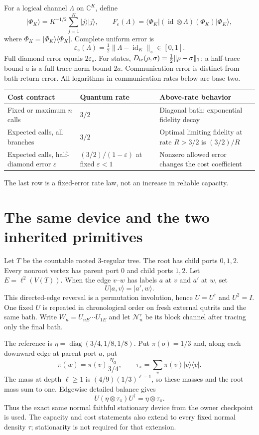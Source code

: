 \documentclass[11pt]{article}
\newcommand{\id}{\operatorname{id}}
\newcommand{\ket}[1]{\lvert #1\rangle}
\newcommand{\bra}[1]{\langle #1\rvert}
\newcommand{\norm}[1]{\lVert #1\rVert}
\newcommand{\cN}{\mathcal N}
\newcommand{\D}{D_{\rm tr}}
\newcommand{\Ph}{\Phi_K}
\begin{document}
For a logical channel $\Lambda$ on $\mathbb C^K$, define
\[
 \ket{\Phi_K}=K^{-1/2}\sum_{j=1}^K\ket{j}\ket{j},\qquad
 F_e(\Lambda)=\bra{\Phi_K}(\id\otimes\Lambda)(\Ph)\ket{\Phi_K},
\]
where $\Ph=\ket{\Phi_K}\bra{\Phi_K}$. Complete uniform error is
\[
 \varepsilon_\diamond(\Lambda)=\tfrac12\norm{\Lambda-\id_K}_\diamond\in[0,1].
\]
Full diamond error equals $2\varepsilon_\diamond$. For states,
$\D(\rho,\sigma)=\tfrac12\norm{\rho-\sigma}_1$; a half-trace bound $a$ is a full trace-norm bound $2a$. Communication error is distinct from bath-return error. All logarithms in communication rates below are base two.

\begin{center}
\begin{tabularx}{\textwidth}{@{}lXX@{}}\toprule
Cost contract & Quantum rate & Above-rate behavior\\\midrule
Fixed or maximum $n$ calls & $3/2$ & Diagonal bath: exponential fidelity decay\\
Expected calls, all branches & $3/2$ & Optimal limiting fidelity at rate $R>3/2$ is $(3/2)/R$\\
Expected calls, half-diamond error $\varepsilon$ & $(3/2)/(1-\varepsilon)$ at fixed $\varepsilon<1$ & Nonzero allowed error changes the cost coefficient\\\bottomrule
\end{tabularx}
\end{center}
The last row is a fixed-error rate law, not an increase in reliable capacity.

\section{The same device and the two inherited primitives}\label{sec:tree}

Let $T$ be the countable rooted $3$-regular tree. The root has child ports $0,1,2$. Every nonroot vertex has parent port $0$ and child ports $1,2$. Let $E=\ell^2(V(T))$. When the edge $v$--$w$ has labels $a$ at $v$ and $a'$ at $w$, set
\begin{equation}
 U\ket{a,v}=\ket{a',w}.\label{eq:U}
\end{equation}
This directed-edge reversal is a permutation involution, hence $U=U^\dagger$ and $U^2=I$. One fixed $U$ is repeated in chronological order on fresh external qutrits and the same bath. Write $W_n=U_{nE}\cdots U_{1E}$ and let $\cN_n^\tau$ be its block channel after tracing only the final bath.

The reference is $\eta=\operatorname{diag}(3/4,1/8,1/8)$. Put $\pi(o)=1/3$ and, along each downward edge at parent port $a$, put
\[
 \pi(w)=\pi(v)\frac{\eta_a}{3/4},\qquad
 \tau_\pi=\sum_v\pi(v)\ket v\bra v.
\]
The mass at depth $\ell\ge1$ is $(4/9)(1/3)^{\ell-1}$, so these masses and the root mass sum to one. Edgewise detailed balance gives
\begin{equation}
 U(\eta\otimes\tau_\pi)U^\dagger=\eta\otimes\tau_\pi.\label{eq:stationary}
\end{equation}
Thus the exact same normal faithful stationary device from the owner checkpoint is used. The capacity and cost statements also extend to every fixed normal density $\tau$; stationarity is not required for that extension.
\end{document}
